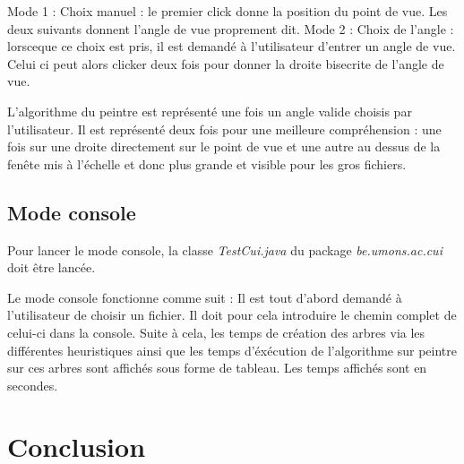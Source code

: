\documentclass[11pt,a4paper]{article}
\begin{document}
Mode 1 : Choix manuel : le premier click donne la position du point de vue. Les deux suivants donnent l'angle de vue proprement dit.
Mode 2 : Choix de l'angle : lorsceque ce choix est pris, il est demandé à l'utilisateur d'entrer un angle de vue. Celui ci peut alors clicker deux fois pour donner la droite bisecrite de l'angle de vue.

L'algorithme du peintre est représenté une fois un angle valide choisis par l'utilisateur. Il est représenté deux fois pour une meilleure compréhension : une fois sur une droite directement sur le point de vue et une autre au dessus de la fenête mis à l'échelle et donc plus grande et visible pour les gros fichiers.

\subsection{Mode console}

Pour lancer le mode console, la classe \textit{TestCui.java} du package \textit{be.umons.ac.cui} doit être lancée.

Le mode console fonctionne comme suit :
Il est tout d'abord demandé à l'utilisateur de choisir un fichier. Il doit pour cela introduire le chemin complet de celui-ci dans la console. Suite à cela, les temps de création des arbres via les différentes heuristiques ainsi que les temps d'éxécution de l'algorithme sur peintre sur ces arbres sont affichés sous forme de tableau. Les temps affichés sont en secondes. 

\section*{Conclusion}

\end{document}
